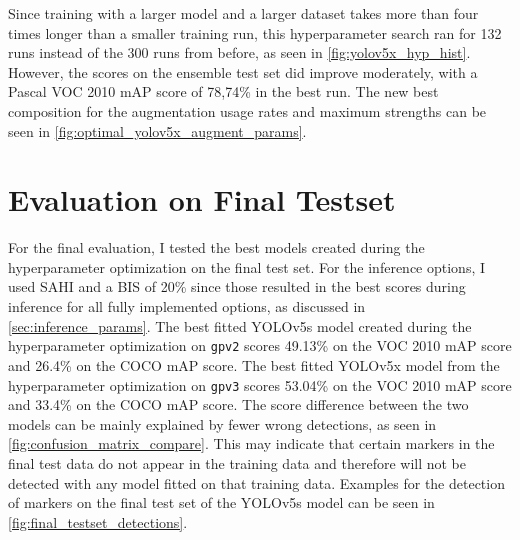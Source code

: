 \documentclass[10pt]{book}
\newcommand{\figureref}[1]{\autoref{#1}}
\begin{document}
Since training with a larger model and a larger dataset takes more than four times longer than a smaller training run, this hyperparameter search ran for 132 runs instead of the 300 runs from before, as seen in \figureref{fig:yolov5x_hyp_hist}. However, the scores on the ensemble test set did improve moderately, with a Pascal VOC 2010 \ac{mAP} score of 78,74\% in the best run. The new best composition for the augmentation usage rates and maximum strengths can be seen in \figureref{fig:optimal_yolov5x_augment_params}.

\section{Evaluation on Final Testset}
\label{sec:final_eval}

For the final evaluation, I tested the best models created during the hyperparameter optimization on the final test set. For the inference options, I used \ac{SAHI} and a \ac{BIS} of 20\% since those resulted in the best scores during inference for all fully implemented options, as discussed in \autoref{sec:inference_params}.
The best fitted \ac{YOLO}v5s model created during the hyperparameter optimization on \texttt{gpv2} scores 49.13\% on the VOC 2010 \ac{mAP} score and 26.4\% on the \ac{COCO} \ac{mAP} score. The best fitted \ac{YOLO}v5x model from the hyperparameter optimization on \texttt{gpv3} scores 53.04\% on the VOC 2010 \ac{mAP} score and 33.4\% on the \ac{COCO} \ac{mAP} score. The score difference between the two models can be mainly explained by fewer wrong detections, as seen in \figureref{fig:confusion_matrix_compare}. This may indicate that certain markers in the final test data do not appear in the training data and therefore will not be detected with any model fitted on that training data. Examples for the detection of markers on the final test set of the \ac{YOLO}v5s model can be seen in \figureref{fig:final_testset_detections}.
\end{document}
